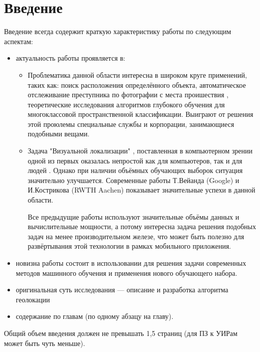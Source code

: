 \chapter*{Введение}
\label{sec:afterwords}

Введение всегда содержит краткую характеристику работы по следующим аспектам:

\begin{itemize}
	\item актуальность работы проявляется в:
	\begin{itemize}
		\item Проблематика данной области интересна в широком круге применений, таких как: 
		поиск расположения определённого объекта, автоматическое отслеживание преступника по фотографии с места проишествия , теоретические исследования алгоритмов глубокого обучения для многоклассовой пространственной классификации. Выиграют от решения этой проюлемы специальные службы и корпорации, занимающиеся подобными вещами.
		\item Задача "Визуальной локализации" \cite{im2gps}, поставленная в компьютерном зрении одной из первых оказалась непростой как для компьютеров, так и для людей \cite{Thompson1999geomReas}. Однако при наличии объёмных обучающих выборок ситуация значительно улучшается. Современные работы Т.Вейанда (Google) и И.Кострикова (RWTH Aachen) \cite{weyand2016planet} показывает значительные успехи в данной области.
		
		Все предыдущие работы используют значительные объёмы данных и вычислительные мощности, а потому интересна задача решения подобных задач на менее производительном железе, что может быть полезно для развёртывания этой  технологии в рамках мобильного приложения.
	\end{itemize}
	\item новизна работы состоит в использовании для решения задачи современных методов машинного обучения и применения нового обучающего набора.
	\item оригинальная суть исследования --- описание и разработка алгоритма геолокации
	\item содержание по главам (по одному абзацу на главу).
\end{itemize}

Общий объем введения должен не превышать 1,5 страниц (для ПЗ к УИРам может быть чуть меньше).


